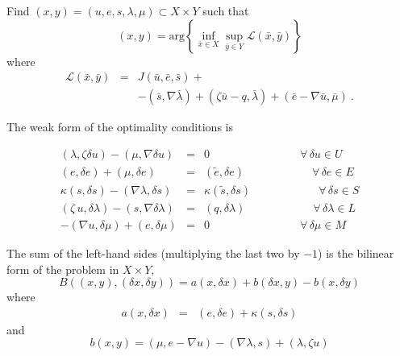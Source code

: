 \documentclass{article}
\begin{document}
\bigskip

 Find $(x,y)=\left ( u, e, s, \lambda, \mu\right ) \subset X\times Y$ such that 
\begin{equation}
(x,y)= \mbox{arg} \left \{ \inf_{\bar{x}\in X} \sup_{\bar{y}\in Y} 
\mathcal{L}(\bar{x},\bar{y})
\right \}
\end{equation}
where
\begin{eqnarray}
\mathcal{L}(\bar{x},\bar{y})&=&J(\bar{u},\bar{e},\bar{s})+ \nonumber \\
& &-\left ( \bar{s},\nabla \bar{\lambda} \right ) + \left (\zeta \bar{u} - q , \bar{\lambda} \right )  
+ \left ( \bar{e}-\nabla \bar{u}, \bar{\mu} \right ) ~.
\end{eqnarray}

The weak form of the optimality conditions is

\begin{eqnarray}
 \left ( \lambda, \zeta\delta u \right ) - \left ( \mu, \nabla \delta u \right ) & = & 0 \qquad\qquad\qquad\qquad \forall \,\delta u\in U  \label{eq:var1}\\
\left ( e,\delta e \right )+ \left ( \mu, \delta e \right ) &=& \left ( \tilde{e},\delta e \right )  \qquad\qquad\qquad \forall \,\delta e \in E\label{eq:var2}\\
\kappa \left ( s, \delta s \right ) - \left ( \nabla \lambda, \delta s \right )  & = & \kappa \left ( \tilde{s},\delta s \right ) \qquad\qquad\qquad \forall\, \delta s \in S \label{eq:var3}\\
\left ( \zeta\,u,\delta \lambda \right )-\left ( s,\nabla \delta \lambda\right )  &=&\left ( q,\delta \lambda \right ) \qquad\qquad\qquad \forall\,\delta \lambda \in L\label{eq:var4}\\
-\left (\nabla u,\delta \mu \right )+\left ( e,\delta \mu \right ) & = & 0 \qquad\qquad\qquad\qquad \forall\,\delta \mu \in M \label{eq:var5}
\end{eqnarray}

\bigskip

The sum of the left-hand sides (multiplying the last two by $-1$) is the bilinear form of the problem in $X\times Y$,
\begin{equation}
B((x,y),(\delta x,\delta y))=a(x,\delta x)+b(\delta x,y)-b(x,\delta y)
\end{equation}
where
\begin{eqnarray}
a(x,\delta x)&=& \left (e,\delta e\right )+\kappa \left ( s,\delta s \right ) 
\end{eqnarray}
and
\begin{equation}
b(x,y)=\left ( \mu,e-\nabla u \right )-\left (\nabla \lambda,s\right ) + \left ( \lambda, \zeta u \right )
\label{eq:bform}
\end{equation}
\end{document}
